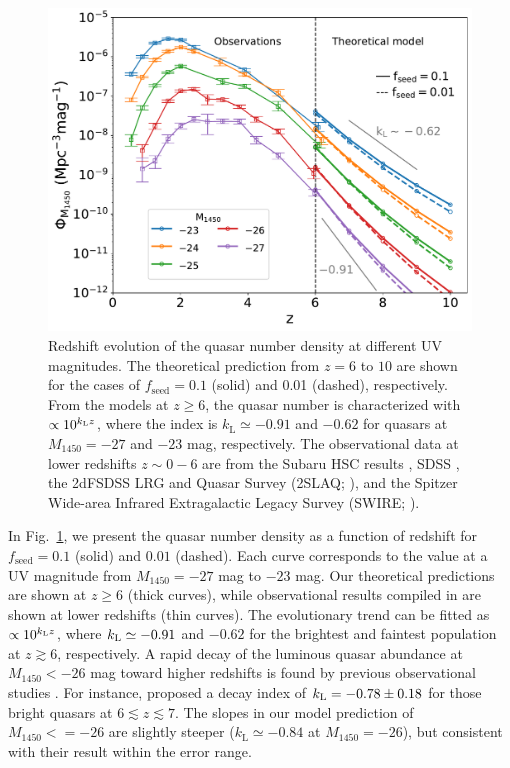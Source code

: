 \documentclass[twocolumn, twocolappendix]{aastex63}
\newcommand{\fseed}{f_\mathrm{seed}}
\newcommand{\Muv}{M_{1450}}
\begin{document}
\begin{CJK*}{UTF8}{gbsn}
\begin{figure}
\centering
\includegraphics[width=130mm]{QLFmag_z.pdf}
\caption{
Redshift evolution of the quasar number density at different UV magnitudes.
The theoretical prediction from $z=6$ to $10$ are shown for the cases of $\fseed=0.1$ (solid) and 0.01 (dashed), respectively.
From the models at $z\geq 6$, the quasar number is characterized with $\propto 10^{k_{\rm L}z}$,
where the index is $k_\mathrm{L} \simeq -0.91$ 
and $-0.62$ for quasars at $\Muv=-27$ and $-23$ mag, respectively.
The observational data at lower redshifts $z\sim 0-6$ are from the Subaru HSC results \citep{2018PASJ...70S..34A,2018ApJ...869..150M,2020ApJ...904...89N},
SDSS \citep{2006AJ....131.2766R,2013ApJ...768..105M},
the 2dFSDSS LRG and Quasar Survey (2SLAQ; \citealt{2009MNRAS.399.1755C}),
and the Spitzer Wide-area Infrared Extragalactic Legacy Survey (SWIRE; \citealt{2008ApJ...675...49S}).
}
\label{fig:QLFmag_z}
\vspace{5mm}
\end{figure}


In Fig.~\ref{fig:QLFmag_z}, we present the quasar number density as a function of redshift for 
$\fseed =0.1$ (solid) and $0.01$ (dashed).
Each curve corresponds to the value at a UV magnitude from $\Muv=-27$ mag to $-23$ mag.
Our theoretical predictions are shown at $z\geq 6$ (thick curves),
while observational results compiled in \cite{2020ApJ...904...89N} are shown at lower redshifts (thin curves).
The evolutionary trend can be fitted as $\propto 10^{k_{\rm L}z}$,
where $k_{\rm L}\simeq -0.91$ and $-0.62$ for the brightest and faintest population
at $z\gtrsim 6$, respectively.
A rapid decay of the luminous quasar abundance at $\Muv<-26$ mag toward higher redshifts is found by 
previous observational studies \citep[e.g.,][]{2001AJ....122.2833F,2013ApJ...768..105M,2016ApJ...833..222J,2019ApJ...884...30W}.
For instance, \citet{2019ApJ...884...30W} proposed a decay index of $k_{\rm L}=-0.78\pm{0.18}$ for those bright quasars at $6\lesssim z \lesssim 7$.
The slopes in our model prediction of $\Muv <=-26$ are slightly steeper ($k_\mathrm{L} \simeq -0.84$ at $\Muv=-26$),
but consistent with their result within the error range.



\end{CJK*}
\end{document}
